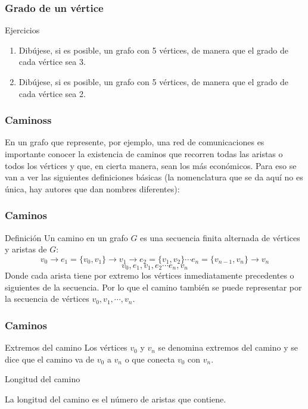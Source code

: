 \documentclass{beamer}
\begin{document}
\begin{frame}
\frametitle{Grado de un v\'ertice}

\begin{block}{Ejercicios}
\begin{enumerate}
\item Dib\'ujese, si es posible, un grafo con 5 v\'ertices, de manera que el grado de cada v\'ertice sea 3. 
\item Dib\'ujese, si es posible, un grafo con 5 v\'ertices, de manera que el grado de cada v\'ertice sea 2. 
\end{enumerate}
\end{block}
\end{frame}




\begin{frame}
\frametitle{Caminoss}
En un grafo que represente, por ejemplo, una red de comunicaciones es importante conocer la existencia de caminos que recorren todas las aristas o todos los v\'ertices y que, en cierta manera, sean los m\'as econ\'omicos. Para eso se van a ver las siguientes definiciones b\'asicas (la nomenclatura que se da aqu\'i no es \'unica, hay autores que dan nombres diferentes):
\end{frame}


\begin{frame}
\frametitle{Caminos}
\begin{block}{Definici\'on}
Un camino en un grafo $G$ es una secuencia finita alternada de v\'ertices y aristas de $G$:
\[v_0\rightarrow e_1 = \{v_0,v_1\}\rightarrow v_1 \rightarrow e_2 = \{v_1,v_2\} \cdots  e_n = \{v_{n-1},v_n\}\rightarrow v_n\]
\[v_0,e_1,v_1,e_2\cdots e_n,v_n\]
Donde cada arista tiene por extremo los v\'ertices inmediatamente precedentes o siguientes de la secuencia. Por lo que el camino tambi\'en se puede representar por la secuencia de v\'ertices $v_0,v_1,\cdots,v_n$.
\end{block}
\end{frame}



\begin{frame}
\frametitle{Caminos}
\begin{block}{Extremos del camino}
Los v\'ertices $v_0$ y $v_n$ se denomina extremos del camino y se dice que el camino va de $v_0$ a $v_n$ o que conecta $v_0$ con $v_n$.
\end{block}

\begin{block}{Longitud del camino}

La longitud del camino es el n\'umero de aristas que contiene.
\end{block}
\end{frame}
\end{document}
